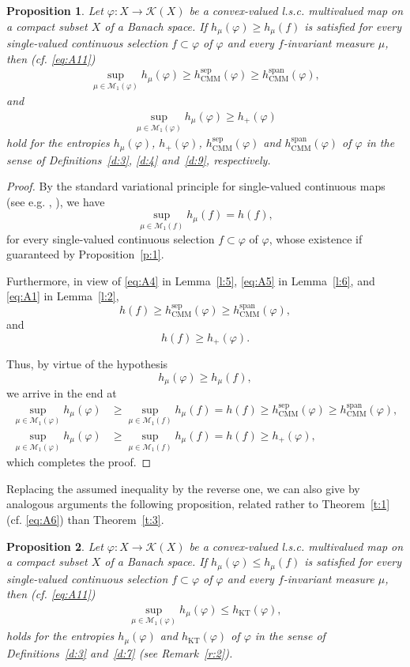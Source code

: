 \documentclass[12pt]{amsart}
\newtheorem{prop}{Proposition}
\theoremstyle{definition}
\newcommand{\M}{{\mathcal{M}}}
\newcommand{\KK}{\mathcal K}
\newcommand{\vp}{\varphi}
\newcommand{\spa}{\operatorname{span}}
\newcommand{\sepp}{\operatorname{sep}}
\newcommand{\KT}{\operatorname{KT}}
\newcommand{\hKT}{h_{\KT}}
\newcommand{\CM}{\operatorname{CMM}}
\newcommand{\hCM}{h_{\CM}}
\begin{document}
\begin{prop}\label{p:2}
Let $\vp:X\to\KK(X)$ be a convex-valued l.s.c. multivalued map on a compact subset $X$ of a Banach space. If $h_\mu(\vp)\geq h_\mu(f)$ is satisfied for every single-valued continuous selection $f\subset\vp$ of $\vp$ and every $f$-invariant measure $\mu$, then (cf. \eqref{eq:A11})
\begin{align*}
\sup_{\mu\in\M_1(\vp)} h_\mu(\vp) \geq \hCM^{\sepp}(\vp)\geq \hCM^{\spa}(\vp),
\end{align*}
and
\begin{align*}
\sup_{\mu\in\M_1(\vp)} h_\mu(\vp) \geq h_+(\vp)
\end{align*}
hold for the entropies $h_\mu(\vp)$, $h_+(\vp)$, $\hCM^{\sepp}(\vp)$ and $\hCM^{\spa}(\vp)$ of $\vp$ in the sense of Definitions~\ref{d:3}, \ref{d:4} and~\ref{d:9}, respectively.
\end{prop}
\begin{proof}
By the standard variational principle for single-valued continuous maps (see e.g. \cite{Mi}, \cite{Wa}), we have
\[
\sup_{\mu\in\M_1(f)} h_\mu(f) = h(f),
\]
for every single-valued continuous selection $f\subset \vp$ of $\vp$, whose existence if guaranteed by Proposition~\ref{p:1}.

Furthermore, in view of \eqref{eq:A4} in Lemma~\ref{l:5}, \eqref{eq:A5} in Lemma~\ref{l:6}, and \eqref{eq:A1} in Lemma~\ref{l:2},
\[
h(f) \geq \hCM^{\sepp}(\vp)\geq\hCM^{\spa}(\vp),
\]
and 
\[
h(f) \geq h_+(\vp).
\]

Thus, by virtue of the hypothesis 
\[
h_\mu(\vp)\geq h_\mu(f),
\]
we arrive in the end at
\begin{align*}
\sup_{\mu\in\M_1(\vp)} h_\mu(\vp) &\geq \sup_{\mu\in\M_1(f)} h_\mu(f) = h(f) \geq \hCM^{\sepp}(\vp)\geq \hCM^{\spa}(\vp),\\
\sup_{\mu\in\M_1(\vp)} h_\mu(\vp) &\geq \sup_{\mu\in\M_1(f)} h_\mu(f) = h(f) \geq h_+(\vp),
\end{align*}
which completes the proof.
\end{proof}


Replacing the assumed inequality by the reverse one, we can also give by analogous arguments the following proposition, related rather to Theorem~\ref{t:1} (cf. \eqref{eq:A6}) than Theorem~\ref{t:3}.


\begin{prop}\label{p:3}
Let $\vp:X\to\KK(X)$ be a convex-valued l.s.c. multivalued map on a compact subset $X$ of a Banach space. If $h_\mu(\vp)\leq h_\mu(f)$ is satisfied for every single-valued continuous selection $f\subset\vp$ of $\vp$ and every $f$-invariant measure $\mu$, then (cf. \eqref{eq:A11})
\begin{align*}
\sup_{\mu\in\M_1(\vp)} h_\mu(\vp) \leq \hKT(\vp),		
\end{align*}
holds for the entropies $h_\mu(\vp)$ and $\hKT(\vp)$ of $\vp$ in the sense of Definitions~\ref{d:3} and~\ref{d:7} (see Remark~\ref{r:2}).
\end{prop}
\end{document}
